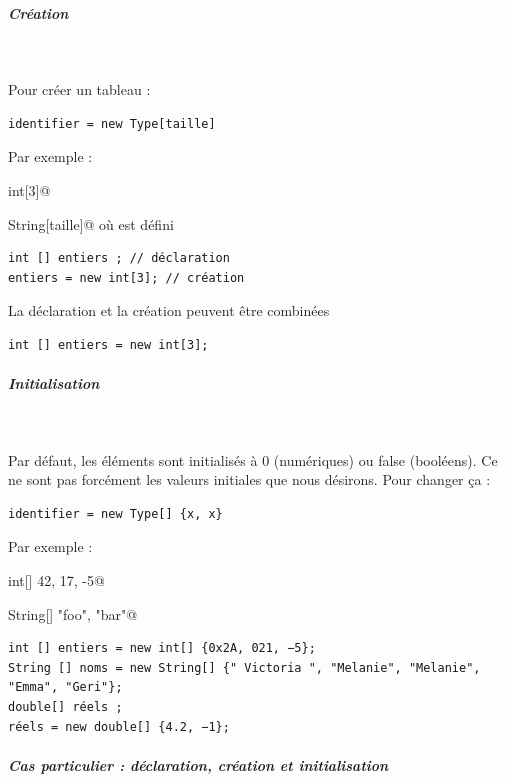 \documentclass[11pt,a4paper]{article}
\begin{document}
		\subparagraph{Cr\'eation} 
		
					\textcolor{white}{.} \par
				
        Pour cr\'eer un tableau : 
      
            \par
        \begin{verbatim}
identifier = new Type[taille]
      \end{verbatim}
        Par exemple :\par
				\verb@new int[3]@\par
				\verb@new String[taille]@ o\`u \verb@taille@ est d\'efini
      
            \par
        \begin{verbatim}
int [] entiers ; // déclaration
entiers = new int[3]; // création
      \end{verbatim}
        La d\'eclaration et la cr\'eation peuvent \^etre combin\'ees
      
            \par
        \begin{verbatim}
int [] entiers = new int[3];
      \end{verbatim}
			
		\subparagraph{Initialisation} 
		
					\textcolor{white}{.} \par
				
        Par d\'efaut, les \'el\'ements sont initialis\'es \`a 0 (num\'eriques) ou false (bool\'eens).
        Ce ne sont pas forc\'ement les valeurs initiales que nous d\'esirons. Pour changer \c ca :
      
            \par
        \begin{verbatim}
identifier = new Type[] {x, x}
      \end{verbatim}
        Par exemple :\par
				\verb@new int[] {42, 17, -5}@\par
				\verb@new String[] {"foo", "bar"}@
            \par
        \begin{verbatim}
int [] entiers = new int[] {0x2A, 021, −5};
String [] noms = new String[] {" Victoria ", "Melanie", "Melanie", "Emma", "Geri"};
double[] réels ;
réels = new double[] {4.2, −1};
      \end{verbatim}
			
		\subparagraph{Cas particulier : d\'eclaration, cr\'eation et initialisation} 
		
\end{document}
